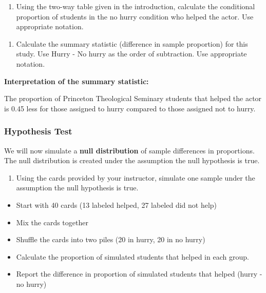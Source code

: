 \documentclass[
]{report}
\providecommand{\tightlist}{%
  \setlength{\itemsep}{0pt}\setlength{\parskip}{0pt}}
\begin{document}
\vspace{.3in}

\begin{enumerate}
\def\labelenumi{\arabic{enumi}.}
\setcounter{enumi}{4}
\tightlist
\item
  Using the two-way table given in the introduction, calculate the conditional proportion of students in the no hurry condition who helped the actor. Use appropriate notation.
\end{enumerate}

\vspace{.3in}

\begin{enumerate}
\def\labelenumi{\arabic{enumi}.}
\setcounter{enumi}{5}
\tightlist
\item
  Calculate the summary statistic (difference in sample proportion) for this study. Use Hurry - No hurry as the order of subtraction. Use appropriate notation.
\end{enumerate}

\vspace{0.5in}

\textbf{Interpretation of the summary statistic:}

The proportion of Princeton Theological Seminary students that helped the actor is 0.45 less for those assigned to hurry compared to those assigned not to hurry.

\subsubsection*{Hypothesis Test}\label{hypothesis-test-1}

We will now simulate a \textbf{null distribution} of sample differences in proportions. The null distribution is created under the assumption the null hypothesis is true.

\begin{enumerate}
\def\labelenumi{\arabic{enumi}.}
\setcounter{enumi}{6}
\tightlist
\item
  Using the cards provided by your instructor, simulate one sample under the assumption the null hypothesis is true.
\end{enumerate}

\begin{itemize}
\item
  Start with 40 cards (13 labeled helped, 27 labeled did not help)
\item
  Mix the cards together
\item
  Shuffle the cards into two piles (20 in hurry, 20 in no hurry)
\item
  Calculate the proportion of simulated students that helped in each group.
\item
  Report the difference in proportion of simulated students that helped (hurry - no hurry)
\end{itemize}
\end{document}
